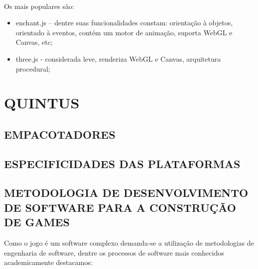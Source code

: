 \documentclass{article}
\begin{document}
\\
Os mais populares são:

\begin{itemize}
    \item enchant.js – dentre suas funcionalidades constam: orientação à objetos, orientado à eventos, contém um motor de animação, suporta WebGL e Canvas, etc;

    \item three.js  - considerada leve, renderiza WebGL e Canvas, arquitetura procedural;
\end{itemize}

\section{QUINTUS}



\subsection{EMPACOTADORES}


\subsection{ESPECIFICIDADES DAS PLATAFORMAS}


\subsection{METODOLOGIA DE DESENVOLVIMENTO DE SOFTWARE PARA A CONSTRUÇÃO DE GAMES}

Como o jogo é um software complexo demanda-se a utilização de metodologias de engenharia de software, dentre os processos de software mais conhecidos academicamente destacamos:
\end{document}
